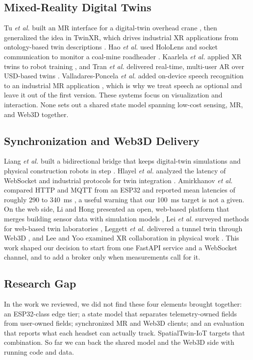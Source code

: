 \documentclass[conference]{IEEEtran}
\begin{document}
\subsection{Mixed-Reality Digital Twins}
Tu \emph{et al.} built an MR interface for a digital-twin overhead crane \cite{tu2021crane}, then generalized the idea in TwinXR, which drives industrial XR applications from ontology-based twin descriptions \cite{tu2023twinxr}. Hao \emph{et al.} used HoloLens and socket communication to monitor a coal-mine roadheader \cite{hao2024roadheader}. Kaarlela \emph{et al.} applied XR twins to robot training \cite{kaarlela2023robotics}, and Tran \emph{et al.} delivered real-time, multi-user AR over USD-based twins \cite{tran2025usd}. Valladares-Poncela \emph{et al.} added on-device speech recognition to an industrial MR application \cite{valladares2025speech}, which is why we treat speech as optional and leave it out of the first version. These systems focus on visualization and interaction. None sets out a shared state model spanning low-cost sensing, MR, and Web3D together.

\subsection{Synchronization and Web3D Delivery}
Liang \emph{et al.} built a bidirectional bridge that keeps digital-twin simulations and physical construction robots in step \cite{liang2020bridge}. Hlayel \emph{et al.} analyzed the latency of WebSocket and industrial protocols for twin integration \cite{hlayel2025latency}. Amirkhanov \emph{et al.} compared HTTP and MQTT from an ESP32 and reported mean latencies of roughly 290 to 340~ms \cite{amirkhanov2025evaluating}, a useful warning that our 100~ms target is not a given. On the web side, Li and Hong presented an open, web-based platform that merges building sensor data with simulation models \cite{li2025platform}, Lei \emph{et al.} surveyed methods for web-based twin laboratories \cite{lei2022labs}, Leggett \emph{et al.} delivered a tunnel twin through Web3D \cite{leggett2025permafrost}, and Lee and Yoo examined XR collaboration in physical work \cite{lee2021collaboration}. This work shaped our decision to start from one FastAPI service and a WebSocket channel, and to add a broker only when measurements call for it.

\subsection{Research Gap}
In the work we reviewed, we did not find these four elements brought together: an ESP32-class edge tier; a state model that separates telemetry-owned fields from user-owned fields; synchronized MR and Web3D clients; and an evaluation that reports what each headset can actually track. SpatialTwin-IoT targets that combination. So far we can back the shared model and the Web3D side with running code and data.
\end{document}
